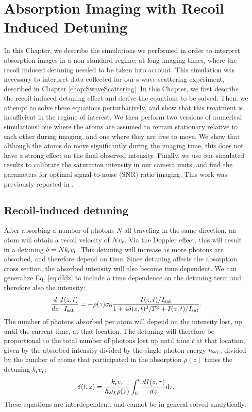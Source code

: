 \renewcommand{\thechapter}{4}

\chapter{Absorption Imaging with Recoil Induced Detuning}\label{AbsorptionImagingChapter}

In this Chapter, we describe the simulations we performed in order to interpret absorption images in a non-standard regime: at long imaging times, where the recoil induced detuning needed to be taken into account. This simulation was necessary to interpret data collected for our s-wave scattering experiment, described in Chapter \ref{chap:SwaveScattering}. In this Chapter, we first describe the recoil-induced detuning effect  and derive the equations to be solved. Then, we attempt to solve these equations perturbatively, and show that this treatment is insufficient in the regime of interest. We then perform two versions of numerical simulations: one where the atoms are assumed to remain stationary relative to each other during imaging, and one where they are free to move. We show that although the atoms do move significantly during the imaging time, this does not have a strong effect on the final observed intensity. Finally, we use our simulated results to calibrate the saturation intensity in our camera units, and find the parameters for optimal signal-to-noise (SNR) ratio imaging. This work was previously reported in \cite{Genkina2015}.


\section{Recoil-induced detuning}

After absorbing a number of photons $N$ all traveling in the same direction, an atom will obtain a recoil velocity of $N v_{\rm{r}}$. Via the Doppler effect, this will result in a detuning $\delta=N k_{\rm{r}} v_{\rm{r}}$. This detuning will increase as more photons are absorbed, and therefore depend on time. Since detuning affects the absorption cross section, the absorbed intensity will also become time dependent. We can generalize Eq. \ref{eq:dIdz} to include a time dependence on the detuning term and therefore also the intensity: 
\begin{equation}
\frac{d}{dz}\frac{I(z,t)}{I_{\rm{sat}}}=-\rho(z)\sigma_0\frac{I(z,t)/I_{\rm{sat}}}{1+4\delta(z,t)^2 /\Gamma^2+I(z,t)/I_{\rm{sat}}}. \label{eq3}
\end{equation}
The number of photons absorbed per atom will depend on the intensity lost, up until the current time, at that location. The detuning will therefore be proportional to the total number of photons lost up until time $t$ at that location, given by the absorbed intensity divided by the single photon energy $\hbar\omega_L$, divided by the number of atoms that participated in the absorption $\rho(z)$ times the detuning $ k_{\rm{r}} v_{\rm{r}}$:
\begin{equation}
\delta(t,z)=\frac{ k_{\rm{r}} v_{\rm{r}}}{\hbar\omega_L\rho(z)}\int_0^t\frac{dI(z,\tau)}{dz}\mathrm{d}\tau.
\label{eq4}
\end{equation}
These equations are interdependent, and cannot be in general solved analytically. 

